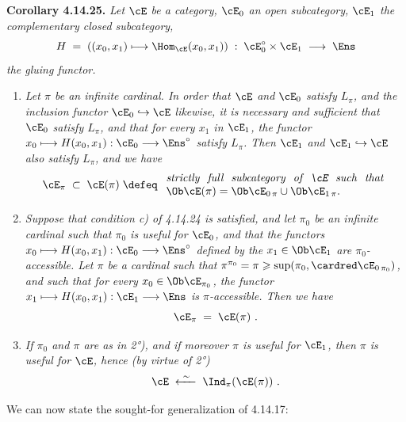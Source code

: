 \textbf{Corollary 4.14.25.} \textit{Let $\cE$ be a category, $\cE_0$ an open subcategory, $\cE_1$ the complementary closed subcategory,}
\[
H \;=\; ((x_0,x_1) \longmapsto \Hom_{\cE}(x_0,x_1)) \;:\; \cE_0^\circ \times \cE_1 \;\longrightarrow\; \Ens
\]
\textit{the gluing functor.}
\begin{enumerate}
\item[\textit{1°)}] \textit{Let $\pi$ be an infinite cardinal. In order that $\cE$ and $\cE_0$ satisfy $L_\pi$, and the inclusion functor $\cE_0 \hookrightarrow \cE$ likewise, it is necessary and sufficient that $\cE_0$ satisfy $L_\pi$, and that for every $x_1$ in $\cE_1$, the functor $x_0 \longmapsto H(x_0,x_1) : \cE_0 \longrightarrow \Ens^\circ$ satisfy $L_\pi$. Then $\cE_1$ and $\cE_1 \hookrightarrow \cE$ also satisfy $L_\pi$,}
\textit{and we have}
\[
\cE_\pi \;\subset\; \cE(\pi) \;\defeq\;
\begin{array}{l}
\text{\itshape strictly\ \ full\ \ subcategory\ \ of\ \ $\cE$\ \ such\ \ that}\\
\Ob\cE(\pi) = \Ob\cE_{0\,\pi} \cup \Ob\cE_{1\,\pi}.
\end{array}
\]
\item[\textit{2°)}] \textit{Suppose that condition c) of 4.14.24 is satisfied, and let $\pi_0$ be an infinite cardinal such that $\pi_0$ is useful for $\cE_0$, and that the functors $x_0 \longmapsto H(x_0,x_1) : \cE_0 \longrightarrow \Ens^\circ$ defined by the $x_1 \in \Ob\cE_1$ are $\pi_0$-accessible. Let $\pi$ be a cardinal such that $\pi^{\pi_0} = \pi \geqslant \sup(\pi_0, \cardred\cE_{0\,\pi_0})$, and such that for every $x_0 \in \Ob\cE_{\pi_0}$, the functor $x_1 \longmapsto H(x_0,x_1) : \cE_1 \longrightarrow \Ens$ is $\pi$-accessible. Then we have}
\[
\cE_\pi \;=\; \cE(\pi)\ .
\]


\item[\textit{3°)}] \textit{If $\pi_0$ and $\pi$ are as in 2°), and if moreover $\pi$ is useful for $\cE_1$, then $\pi$ is useful for $\cE$, hence (by virtue of 2°)}
\[
\cE \;\xleftarrow{\ \sim\ }\; \Ind_\pi(\cE(\pi))\ .
\]
\end{enumerate}
We can now state the sought-for generalization of 4.14.17:

